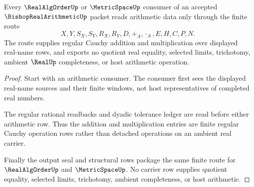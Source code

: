 \begin{theorem}
\label{thm:bishop-real-arithmetic-downstream-route}
Every $\RealAlgOrderUp$ or $\MetricSpaceUp$ consumer of an accepted $\BishopRealArithmeticUp$ packet reads arithmetic data only through the finite route
$$
X,Y,S_X,S_Y,R_X,R_Y,D,+_A,\cdot_A,E,H,C,P,N .
$$
The route supplies regular Cauchy addition and multiplication over displayed real-name rows, and exports no quotient real equality, selected limits, trichotomy, ambient $\RealUp$ completeness, or host arithmetic operation.
\end{theorem}
\begin{proof}
Start with an arithmetic consumer. The consumer first sees the displayed real-name sources and their finite windows, not host representatives of completed real numbers.

The regular rational readbacks and dyadic tolerance ledger are read before either arithmetic row. Thus the addition and multiplication entries are finite regular Cauchy operation rows rather than detached operations on an ambient real carrier.

Finally the output seal and structural rows package the same finite route for $\RealAlgOrderUp$ and $\MetricSpaceUp$. No carrier row supplies quotient equality, selected limits, trichotomy, ambient completeness, or host arithmetic.
\end{proof}




